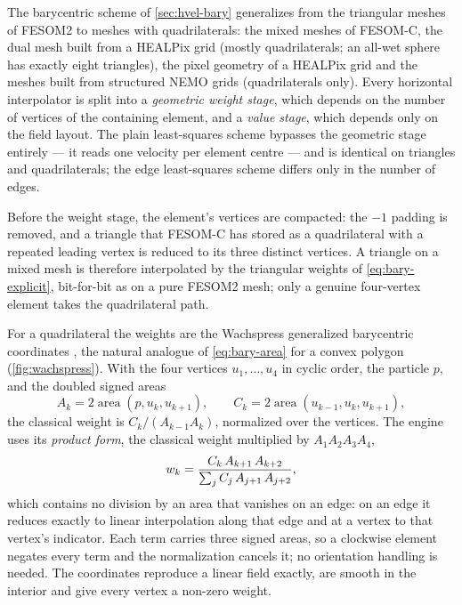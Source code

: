 The barycentric scheme of \cref{sec:hvel-bary} generalizes from the triangular meshes of FESOM2 to
meshes with quadrilaterals: the mixed meshes of FESOM-C, the dual mesh built from a HEALPix grid
(mostly quadrilaterals; an all-wet sphere has exactly eight triangles), the pixel geometry of a
HEALPix grid and the meshes built from structured NEMO grids (quadrilaterals only). Every horizontal
interpolator is split into a \emph{geometric weight stage}, which depends on the number of vertices of
the containing element, and a \emph{value stage}, which depends only on the field layout. The plain
least-squares scheme bypasses the geometric stage entirely --- it reads one velocity per element
centre --- and is identical on triangles and quadrilaterals; the edge least-squares scheme differs only
in the number of edges.

Before the weight stage, the element's vertices are compacted: the $-1$ padding is removed, and a
triangle that FESOM-C has stored as a quadrilateral with a repeated leading vertex is reduced to its
three distinct vertices. A triangle on a mixed mesh is therefore interpolated by the triangular
weights of \cref{eq:bary-explicit}, bit-for-bit as on a pure FESOM2 mesh; only a genuine four-vertex
element takes the quadrilateral path.

For a quadrilateral the weights are the Wachspress generalized barycentric coordinates
\citep{warren1996barycentric,floater2003mvc}, the natural analogue of \cref{eq:bary-area} for a convex
polygon (\cref{fig:wachspress}). With the four vertices $u_1,\dots,u_4$ in cyclic order, the particle
$p$, and the doubled signed areas
\begin{equation}\label{eq:wachspress}
  A_k = 2\operatorname{area}(p,u_k,u_{k+1}), \qquad
  C_k = 2\operatorname{area}(u_{k-1},u_k,u_{k+1}),
\end{equation}
the classical weight is $C_k/(A_{k-1}A_k)$, normalized over the vertices. The engine uses its
\emph{product form}, the classical weight multiplied by $A_1A_2A_3A_4$,
\begin{equation}\label{eq:wachspress-product}
  w_{k} = \frac{C_k\,A_{k+1}\,A_{k+2}}{\sum_{j} C_j\,A_{j+1}\,A_{j+2}} ,
\end{equation}
which contains no division by an area that vanishes on an edge: on an edge it reduces exactly to
linear interpolation along that edge and at a vertex to that vertex's indicator. Each term carries
three signed areas, so a clockwise element negates every term and the normalization cancels it; no
orientation handling is needed. The coordinates reproduce a linear field exactly, are smooth in the
interior and give every vertex a non-zero weight.

